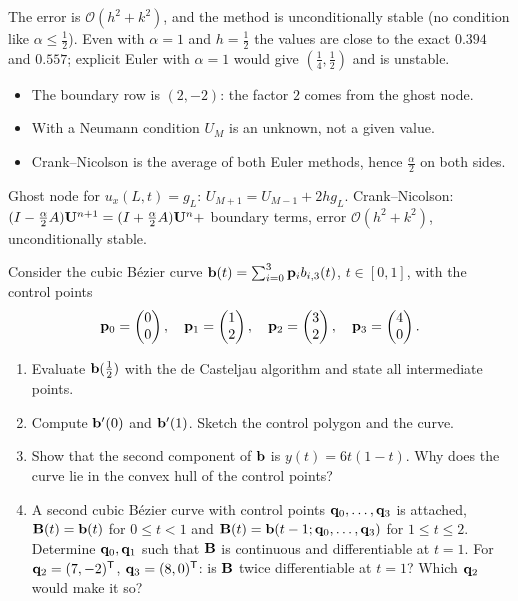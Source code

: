 \begin{solution}
 The error is $\mathcal O(h^2+k^2)$, and the method is unconditionally stable (no condition like $\alpha\le\frac12$). Even with $\alpha=1$ and $h=\frac12$ the values are close to the exact $0.394$ and $0.557$; explicit Euler with $\alpha=1$ would give $(\frac14,\frac12)$ and is unstable. 

\begin{trap}
\begin{itemize}
\item The boundary row is $(2,-2)$: the factor $2$ comes from the ghost node.
\item With a Neumann condition $U_M$ is an unknown, not a given value.
\item Crank--Nicolson is the average of both Euler methods, hence $\frac\alpha2$ on both sides.
\end{itemize}
\end{trap}
\begin{heart}
Ghost node for $u_x(L,t)=g_L$: $U_{M+1}=U_{M-1}+2hg_L$. Crank--Nicolson: $(I-\frac\alpha2A)\mathbf{U}^{n+1}=(I+\frac\alpha2A)\mathbf{U}^n+$ boundary terms, error $\mathcal O(h^2+k^2)$, unconditionally stable.
\end{heart}
\end{solution}

Consider the cubic Bézier curve $\mathbf{b}(t)=\sum_{i=0}^3\mathbf{p}_ib_{i,3}(t)$, $t\in[0,1]$, with the control points
\[
\mathbf{p}_0=\begin{pmatrix}0\\0\end{pmatrix},\quad \mathbf{p}_1=\begin{pmatrix}1\\2\end{pmatrix},\quad \mathbf{p}_2=\begin{pmatrix}3\\2\end{pmatrix},\quad \mathbf{p}_3=\begin{pmatrix}4\\0\end{pmatrix}.
\]
\begin{enumerate}
\item Evaluate $\mathbf{b}(\frac12)$ with the de Casteljau algorithm and state all intermediate points.
\item Compute $\mathbf{b}'(0)$ and $\mathbf{b}'(1)$. Sketch the control polygon and the curve.
\item Show that the second component of $\mathbf{b}$ is $y(t)=6t(1-t)$. Why does the curve lie in the convex hull of the control points?
\item A second cubic Bézier curve with control points $\mathbf{q}_0,\dots,\mathbf{q}_3$ is attached, $\mathbf{B}(t)=\mathbf{b}(t)$ for $0\le t<1$ and $\mathbf{B}(t)=\mathbf{b}(t-1;\mathbf{q}_0,\dots,\mathbf{q}_3)$ for $1\le t\le2$. Determine $\mathbf{q}_0,\mathbf{q}_1$ such that $\mathbf{B}$ is continuous and differentiable at $t=1$. For $\mathbf{q}_2=(7,-2)^{\mathsf{T}}$, $\mathbf{q}_3=(8,0)^{\mathsf{T}}$: is $\mathbf{B}$ twice differentiable at $t=1$? Which $\mathbf{q}_2$ would make it so?
\end{enumerate}

